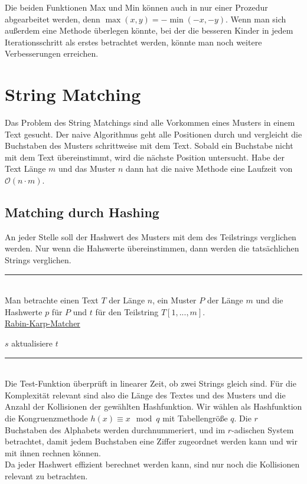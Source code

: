 \documentclass[a4paper, 12pt]{article}
\begin{document}
	Die beiden Funktionen Max und Min können auch in nur einer Prozedur abgearbeitet werden, denn $\max(x,y) = -\min(-x,-y)$. Wenn man sich außerdem eine Methode überlegen könnte, bei der die besseren Kinder in jedem Iterationsschritt als erstes betrachtet werden, könnte man noch weitere Verbesserungen erreichen.
	\section{String Matching} 
	Das Problem des String Matchings sind alle Vorkommen eines Musters in einem Text gesucht. Der naive Algorithmus geht alle Positionen durch und vergleicht die Buchstaben des Musters schrittweise mit dem Text. Sobald ein Buchstabe nicht mit dem Text übereinstimmt, wird die nächste Position untersucht. Habe der Text Länge $m$ und das Muster $n$ dann hat die naive Methode eine Laufzeit von $\mathcal{O}(n\cdot m)$.
	\subsection{Matching durch Hashing}
	An jeder Stelle soll der Hashwert des Musters mit dem des Teilstrings verglichen werden. Nur wenn die Hahswerte übereinstimmen, dann werden die tatsächlichen Strings verglichen.
	\par\noindent\rule{\textwidth}{0.4pt}\\
	Man betrachte einen Text $T$ der Länge $n$, ein Muster $P$ der Länge $m$ und die Hashwerte $p$ für $P$ und $t$ für den Teilstring $T[1,...,m]$.\\
	\underline{Rabin-Karp-Matcher}
	\begin{algorithmic}[1]
		\Return $s$
		\EndIf
		\EndIf
		\State aktualisiere $t$
		\EndIf
		\EndFor
	\end{algorithmic}
	\par\noindent\rule{\textwidth}{0.4pt}\\
	Die Test-Funktion überprüft in linearer Zeit, ob zwei Strings gleich sind. Für die Komplexität relevant sind also die Länge des Textes und des Musters und die Anzahl der Kollisionen der gewählten Hashfunktion. Wir wählen als Hashfunktion die Kongruenzmethode $h(x) \equiv x \mod q$ mit Tabellengröße $q$. Die $r$ Buchstaben des Alphabets werden durchnummeriert, und im $r$-adischen System betrachtet, damit jedem Buchstaben eine Ziffer zugeordnet werden kann und wir mit ihnen rechnen können.\\
	Da jeder Hashwert effizient berechnet werden kann, sind nur noch die Kollisionen relevant zu betrachten.   
\end{document}
